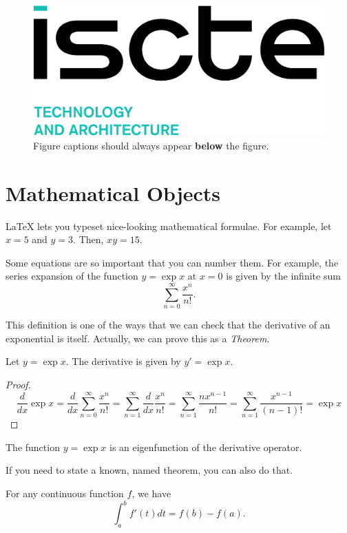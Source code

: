 \documentclass[12pt,reqno,twoside]{amsbook}
\begin{document}
\begin{figure}
    \centering
    \includegraphics[width=0.3\linewidth]{images/ista.png}
    \caption{Figure captions should always appear \textbf{below} the figure.}
    \label{fig:example}
\end{figure}

\section{Mathematical Objects}

LaTeX lets you typeset nice-looking mathematical formulae. For example, let $x = 5$ and $y = 3$. Then, $xy = 15$.

Some equations are so important that you can number them. For example, the series expansion of the function $y = \exp{x}$ at $x=0$ is given by the infinite sum
\begin{equation}
    \sum_{n=0}^{\infty} \frac{x^n}{n!}.
\end{equation}

This definition is one of the ways that we can check that the derivative of an exponential is itself. Actually, we can prove this as a \textit{Theorem}.

\begin{theorem}
    Let $y = \exp{x}$. The derivative is given by $y' = \exp{x}$.
\end{theorem}

\begin{proof}
\[
\frac{d}{dx} \exp{x} = \frac{d}{dx} \sum_{n=0}^{\infty} \frac{x^n}{n!} = \sum_{n=1}^{\infty} \frac{d}{dx} \frac{x^n}{n!} = \sum_{n=1}^{\infty}  \frac{n x^{n-1}}{n!} = \sum_{n=1}^{\infty}  \frac{x^{n-1}}{(n-1)!} = \exp{x}
\]
\end{proof}

\begin{corollary}
    The function $y=\exp{x}$ is an eigenfunction of the derivative operator.
\end{corollary}

\noindent If you need to state a known, named theorem, you can also do that.

\begin{theorem}
For any continuous function $f$, we have
    \[
    \int_{a}^{b} f'(t) dt = f(b) - f(a).
    \]
\end{theorem}
\end{document}
